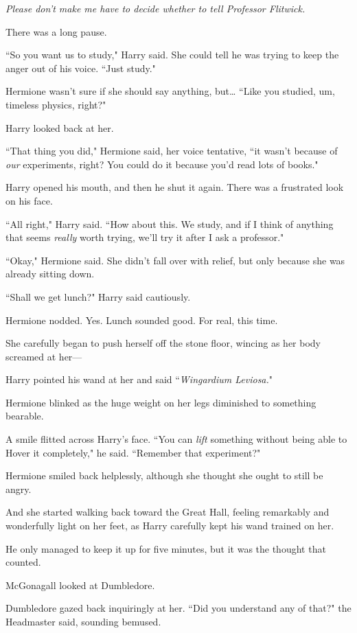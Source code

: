 \emph{Please don't make me have to decide whether to tell Professor Flitwick.}

There was a long pause.

``So you want us to study," Harry said. She could tell he was trying to keep the anger out of his voice. ``Just study."

Hermione wasn't sure if she should say anything, but{\ldots} ``Like you studied, um, timeless physics, right?"

Harry looked back at her.

``That thing you did," Hermione said, her voice tentative, ``it wasn't because of \emph{our} experiments, right? You could do it because you'd read lots of books."

Harry opened his mouth, and then he shut it again. There was a frustrated look on his face.

``All right," Harry said. ``How about this. We study, and if I think of anything that seems \emph{really} worth trying, we'll try it after I ask a professor."

``Okay," Hermione said. She didn't fall over with relief, but only because she was already sitting down.

``Shall we get lunch?" Harry said cautiously.

Hermione nodded. Yes. Lunch sounded good. For real, this time.

She carefully began to push herself off the stone floor, wincing as her body screamed at her—

Harry pointed his wand at her and said ``\emph{Wingardium Leviosa.}"

Hermione blinked as the huge weight on her legs diminished to something bearable.

A smile flitted across Harry's face. ``You can \emph{lift} something without being able to Hover it completely," he said. ``Remember that experiment?"

Hermione smiled back helplessly, although she thought she ought to still be angry.

And she started walking back toward the Great Hall, feeling remarkably and wonderfully light on her feet, as Harry carefully kept his wand trained on her.

He only managed to keep it up for five minutes, but it was the thought that counted.

\later

McGonagall looked at Dumbledore.

Dumbledore gazed back inquiringly at her. ``Did you understand any of that?" the Headmaster said, sounding bemused.


